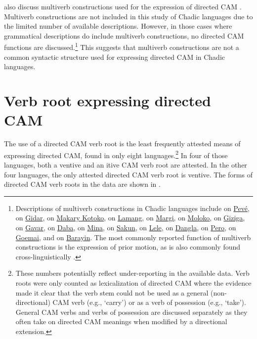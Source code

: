 \citet{hellwigBringingTakingCrosslinguistic2022} also discuss multiverb constructions used for the expression of directed CAM \citep[see also][104--106]{lovestrandSerialVerbConstructions2021a}. Multiverb constructions are not included in this study of Chadic languages due to the limited number of available descriptions. However, in those cases where grammatical descriptions do include multiverb constructions, no directed CAM functions are discussed.\footnote{Descriptions of multiverb constructions in Chadic languages include \citet[185--189]{shayGrammarPeve2020} on \hyperref[peve]{Pevé}, \citet[445]{frajzyngierGrammarGidar2008} on \hyperref[gida]{Gidar}, \citet[409]{allisonGrammarMakaryKotoko2020} on \hyperref[maka]{Makary Kotoko}, \citet[146]{wolffLamangLanguageDictionary2015} on \hyperref[lama]{Lamang}, \citet[210]{hoffmannGrammarMargiLanguage1963} on \hyperref[marg]{Margi}, \citet[269]{friesenGrammarMoloko2017} on \hyperref[molo]{Moloko}, \citet[215--218]{shayGrammarGizigaChadic2021} on \hyperref[gizi]{Giziga}, \citet[65]{viljoenGavarVerbPhrase2017} on \hyperref[gava]{Gavar}, \citet[2--3]{lienhardDabaGrammarClause1978} on \hyperref[daba]{Daba}, \citet[373--376]{frajzyngierGrammarMina2005} on \hyperref[mina]{Mina}, \citet[131--134]{thomasGrammarSakunSukur2014} on \hyperref[saku]{Sakun}, \citet[183--187]{frajzyngierGrammarLele2001} on \hyperref[lele]{Lele}, \citet[217]{peustSupplementsWestDangla2016} on \hyperref[dang]{Dangla}, \citet[250]{frajzyngierGrammarPero1989} on \hyperref[pero]{Pero}, \citet[412]{hellwigGrammarGoemai2011} on \hyperref[goem]{Goemai}, and \citet{lovestrandSerialVerbConstructions2018} on \hyperref[bara]{Barayin}. The most commonly reported function of multiverb constructions is the expression of prior motion, as is also commonly found cross-linguistically \citep{lovestrandSerialVerbConstructions2021a}.} This suggests that multiverb constructions are not a common syntactic structure used for expressing directed CAM in Chadic languages.

\section{Verb root expressing directed CAM} \label{sec:dcamverb}

The use of a directed CAM verb root is the least frequently attested means of expressing directed CAM, found in only eight languages.\footnote{These numbers potentially reflect under-reporting in the available data. Verb roots were only counted as lexicalization of directed CAM where the evidence made it clear that the verb stem could not be used as a general (non-directional) CAM verb (e.g., `carry') or as a verb of possession (e.g., `take'). General CAM verbs and verbs of possession are discussed separately as they often take on directed CAM meanings when modified by a directional extension.} In four of those languages, both a ventive and an itive CAM verb root are attested. In the other four languages, the only attested directed CAM verb root is ventive. The forms of directed CAM verb roots in the data are shown in .

